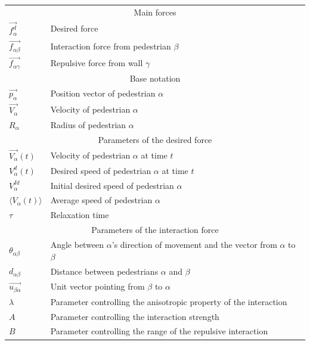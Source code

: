 \begin{table}[h]
    \centering
    \begin{tabular}{l l}
        \toprule
        \multicolumn{2}{c}{\textsf{Main forces}}\\
        $\overrightarrow{f_{\alpha}^{d}}$ & Desired force\\
        $\overrightarrow{f_{\alpha \beta}}$ & Interaction force from pedestrian 
        $\beta$\\
        $\overrightarrow{f_{\alpha \gamma}}$ & Repulsive force from wall 
        $\gamma$\\

        \midrule
        \multicolumn{2}{c}{\textsf{Base notation}}\\
        $\overrightarrow{p_{\alpha}}$ & Position vector of pedestrian 
        $\alpha$\\
        $\overrightarrow{V_{\alpha}}$ & Velocity of pedestrian $\alpha$ \\ 
        \addlinespace[0.3em]
        $R_\alpha$ & Radius of pedestrian $\alpha$\\

        \midrule
        \multicolumn{2}{c}{\textsf{Parameters of the desired force}}\\
        $\overrightarrow{V_{\alpha}}(t)$ & Velocity of pedestrian $\alpha$ 
        at time $t$\\
        $V_{\alpha}^{d}(t)$ & Desired speed of pedestrian $\alpha$ at time 
        $t$\\
        $V_{\alpha}^{Id}$ & Initial desired speed of pedestrian $\alpha$ \\
        $\langle V_{\alpha}(t) \rangle$ & Average speed of pedestrian 
        $\alpha$ \\
        $\tau$& Relaxation time \\

        \midrule
        \multicolumn{2}{c}{\textsf{Parameters of the interaction force}}\\
        $\theta_{\alpha \beta}$ & Angle between $\alpha$'s direction of 
        movement and the vector from $\alpha$ to $\beta$\\
        $d_{\alpha \beta}$& Distance between pedestrians $\alpha$ and $\beta$ \\
        $\overrightarrow{u_{\beta \alpha}}$& Unit vector pointing from $\beta$ to $\alpha$ \\
        $\lambda$& Parameter controlling the anisotropic property of the 
        interaction\\
        $A$& Parameter controlling the interaction strength \\
        $B$& Parameter controlling the range of the repulsive interaction  \\


\end{tabular}
\end{table}

